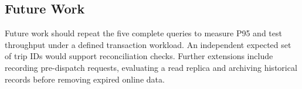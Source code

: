 \subsection{Future Work}
Future work should repeat the five complete queries to measure P95 and test throughput under a defined transaction workload. An independent expected set of trip IDs would support reconciliation checks. Further extensions include recording pre-dispatch requests, evaluating a read replica and archiving historical records before removing expired online data.
